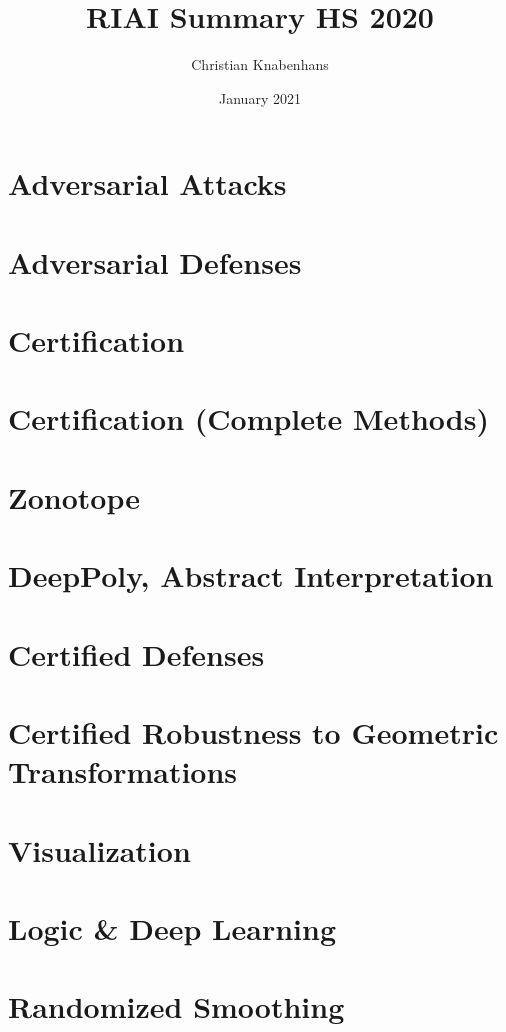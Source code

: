 \documentclass[11pt]{article}
\title{RIAI Summary HS 2020}
\author{Christian Knabenhans}
\date{January 2021}
\begin{document}
\pagestyle{empty}
\begin{multicols*}{3}
\section*{Adversarial Attacks}

\section*{Adversarial Defenses}

\section*{Certification}

\section*{Certification (Complete Methods)}
\section*{Zonotope}
\section*{DeepPoly, Abstract Interpretation}
\section*{Certified Defenses}
\section*{Certified Robustness to Geometric Transformations}
\section*{Visualization}
\section*{Logic \& Deep Learning}
\section*{Randomized Smoothing}
\end{multicols*}
\end{document}
